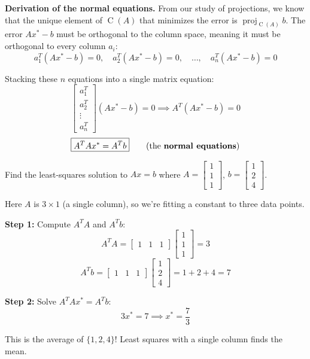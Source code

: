 \documentclass[11pt]{article}
\theoremstyle{definition}
\theoremstyle{plain}
\theoremstyle{remark}
\DeclareMathOperator{\proj}{proj}
\DeclareMathOperator{\Col}{C}
\begin{document}
\textbf{Derivation of the normal equations.} From our study of projections, we know that the unique element of $\Col(A)$ that minimizes the error is $\proj_{\Col(A)} b$. The error $Ax^* - b$ must be orthogonal to the column space, meaning it must be orthogonal to every column $a_i$:
\[
a_1^T(Ax^* - b) = 0, \quad a_2^T(Ax^* - b) = 0, \quad \ldots, \quad a_n^T(Ax^* - b) = 0
\]

Stacking these $n$ equations into a single matrix equation:
\[
\begin{bmatrix} a_1^T \\ a_2^T \\ \vdots \\ a_n^T \end{bmatrix} (Ax^* - b) = 0 \implies A^T(Ax^* - b) = 0
\]
\[
\boxed{A^T A x^* = A^T b} \qquad \text{(the \textbf{normal equations})}
\]

\begin{workedexample}[title=\textbf{Worked Example: Least squares with no exact solution}]
Find the least-squares solution to $Ax = b$ where $A = \begin{bmatrix}1\\1\\1\end{bmatrix}$, $b = \begin{bmatrix}1\\2\\4\end{bmatrix}$.

Here $A$ is $3 \times 1$ (a single column), so we're fitting a constant to three data points.

\textbf{Step 1:} Compute $A^T A$ and $A^T b$:
\[
A^T A = \begin{bmatrix}1&1&1\end{bmatrix}\begin{bmatrix}1\\1\\1\end{bmatrix} = 3
\]
\[
A^T b = \begin{bmatrix}1&1&1\end{bmatrix}\begin{bmatrix}1\\2\\4\end{bmatrix} = 1 + 2 + 4 = 7
\]

\textbf{Step 2:} Solve $A^T A x^* = A^T b$:
\[
3x^* = 7 \implies x^* = \frac{7}{3}
\]

This is the average of $\{1, 2, 4\}$! Least squares with a single column finds the mean.
\end{workedexample}
\end{document}
